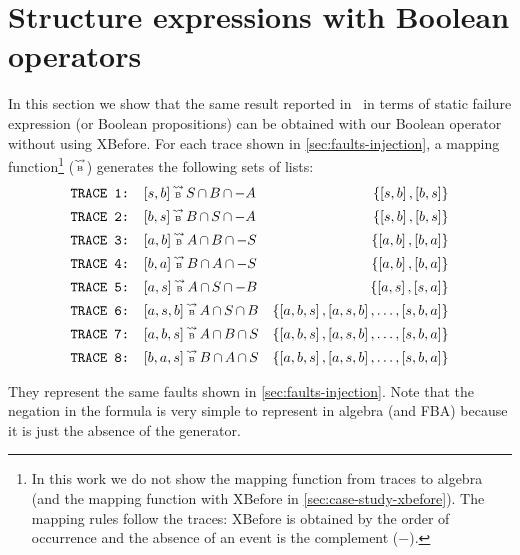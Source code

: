 \documentclass[12pt,openright,twoside,a4paper,oldfontcommands,english,brazil,final]{abntex2}
\theoremstyle{theo}
\def\tracetobool{\ensuremath\operatorname{\stackrel{\leadsto}{\text{\tiny B}}}}
\newcommand{\setsin}[1]{\ensuremath\left\{ #1 \right\}}
\newcommand{\listsin}[1]{\ensuremath\left[ #1 \right]}
\def\inter{\ensuremath\operatorname{\cap}}
\begin{document}
\section{Structure expressions with Boolean operators}

In this section we show that the same result reported in~\cite{DM2012} in terms of static failure expression (or Boolean propositions) can be obtained with our Boolean operator without using \ac{XBefore}.
For each trace shown in \cref{sec:faults-injection}, a mapping function\footnote{In this work we do not show the mapping function from traces to \ac{algebra} (and the mapping function with \ac{XBefore} in \cref{sec:case-study-xbefore}).
The mapping rules follow the traces: \ac{XBefore} is obtained by the order of occurrence and the absence of an event is the complement ($-$).} ($\tracetobool$) generates the following sets of lists:
%
\begin{align*}
\text{\texttt{TRACE 1: }}&[s,b] \tracetobool S \inter B \inter -A & \setsin{\listsin{s,b},\listsin{b,s}}\\
\text{\texttt{TRACE 2: }}&[b,s] \tracetobool B \inter S \inter -A & \setsin{\listsin{s,b},\listsin{b,s}}\\
\text{\texttt{TRACE 3: }}&[a,b] \tracetobool A \inter B \inter -S & \setsin{\listsin{a,b},\listsin{b,a}}\\
\text{\texttt{TRACE 4: }}&[b,a] \tracetobool B \inter A \inter -S & \setsin{\listsin{a,b},\listsin{b,a}}\\
\text{\texttt{TRACE 5: }}&[a,s] \tracetobool A \inter S \inter -B & \setsin{\listsin{a,s},\listsin{s,a}}\\
\text{\texttt{TRACE 6: }}&[a,s,b] \tracetobool A \inter S \inter B & \setsin{\listsin{a,b,s},\listsin{a,s,b},\ldots,\listsin{s,b,a}}\\
\text{\texttt{TRACE 7: }}&[a,b,s] \tracetobool A \inter B \inter S & \setsin{\listsin{a,b,s},\listsin{a,s,b},\ldots,\listsin{s,b,a}}\\
\text{\texttt{TRACE 8: }}&[b,a,s] \tracetobool B \inter A \inter S & \setsin{\listsin{a,b,s},\listsin{a,s,b},\ldots,\listsin{s,b,a}}\\
\end{align*}

They represent the same faults shown in \cref{sec:faults-injection}.
Note that the negation in the formula is very simple to represent in \ac{algebra} (and \ac{FBA}) because it is just the absence of the generator.
\end{document}
